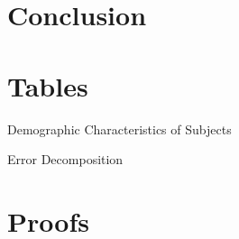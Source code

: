 \documentclass[12pt,a4paper]{article}
\begin{document}
\section{Conclusion}

 

\vspace{20pt}



\clearpage





\appendix

\newpage
\section{Tables}


\begin{table}[h!]
\caption{Demographic Characteristics of Subjects} \label{summ_tab}

\end{table}

\begin{table}[h!]
\caption{Error Decomposition} \label{belief_decomposition}

\end{table}

 \label{ip_tab}

 \label{wtp_dem}

 \label{wtp_risk}
%
%
%





\newpage
\section{Proofs}
\small
\end{document}

